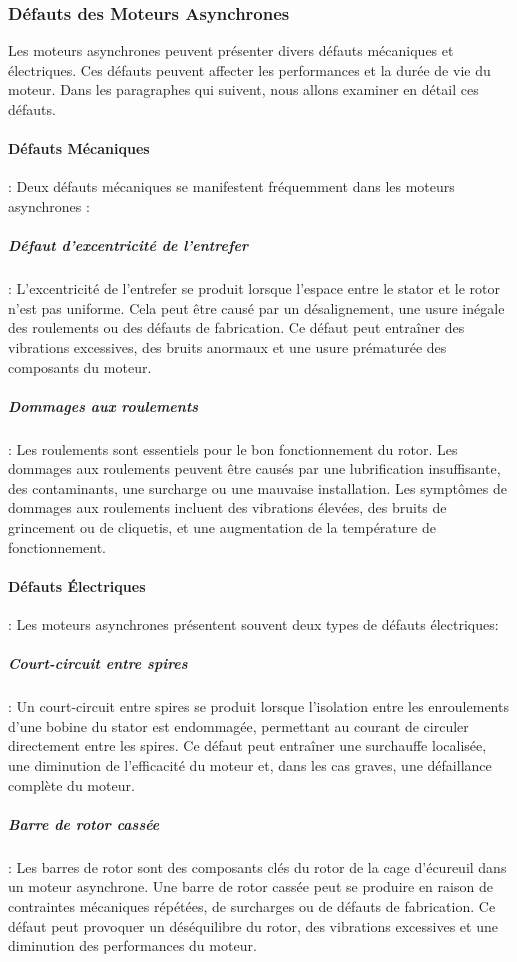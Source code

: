 \subsubsection{Défauts des Moteurs Asynchrones}

Les moteurs asynchrones peuvent présenter divers défauts mécaniques et
électriques. Ces défauts peuvent affecter les performances et la durée de vie
du moteur. Dans les paragraphes qui suivent, nous allons examiner en détail ces
défauts.

\paragraph{Défauts Mécaniques} : Deux défauts mécaniques se manifestent fréquemment dans les moteurs asynchrones :

\subparagraph{Défaut d'excentricité de l'entrefer}:
L'excentricité de l'entrefer se produit lorsque l'espace entre le stator et le
rotor n'est pas uniforme. Cela peut être causé par un désalignement, une usure
inégale des roulements ou des défauts de fabrication. Ce défaut peut entraîner
des vibrations excessives, des bruits anormaux et une usure prématurée des
composants du moteur.

\subparagraph{Dommages aux roulements}:
Les roulements sont essentiels pour le bon fonctionnement du rotor. Les
dommages aux roulements peuvent être causés par une lubrification insuffisante,
des contaminants, une surcharge ou une mauvaise installation. Les symptômes de
dommages aux roulements incluent des vibrations élevées, des bruits de
grincement ou de cliquetis, et une augmentation de la température de
fonctionnement.

\paragraph{Défauts Électriques} : Les moteurs asynchrones présentent souvent deux types de défauts électriques:

\subparagraph{Court-circuit entre spires}:
Un court-circuit entre spires se produit lorsque l'isolation entre les
enroulements d'une bobine du stator est endommagée, permettant au courant de
circuler directement entre les spires. Ce défaut peut entraîner une surchauffe
localisée, une diminution de l'efficacité du moteur et, dans les cas graves,
une défaillance complète du moteur.

\subparagraph{Barre de rotor cassée}:
Les barres de rotor sont des composants clés du rotor de la cage d'écureuil
dans un moteur asynchrone. Une barre de rotor cassée peut se produire en raison
de contraintes mécaniques répétées, de surcharges ou de défauts de fabrication.
Ce défaut peut provoquer un déséquilibre du rotor, des vibrations excessives et
une diminution des performances du moteur.

